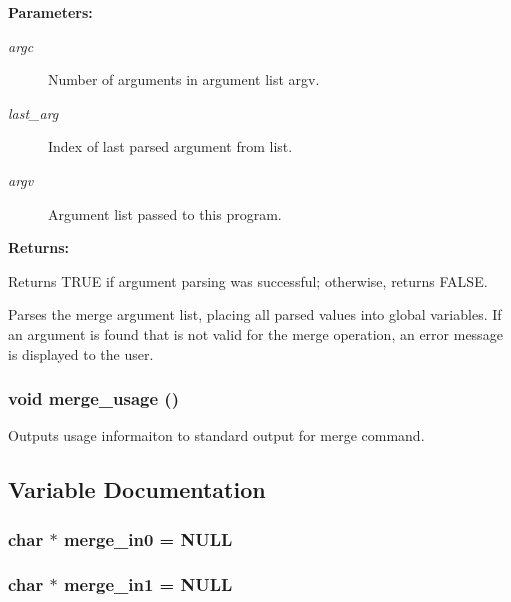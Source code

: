 \begin{Desc}
\item[{\bf Parameters: }]\par
\begin{description}
\item[
{\em argc}]Number of arguments in argument list argv. \item[
{\em last\_\-arg}]Index of last parsed argument from list. \item[
{\em argv}]Argument list passed to this program.

\end{description}
\end{Desc}
\begin{Desc}
\item[{\bf Returns: }]\par
Returns TRUE if argument parsing was successful; otherwise, returns FALSE.

\end{Desc}
Parses the merge argument list, placing all parsed values into global variables. If an argument is found that is not valid for the merge operation, an error message is displayed to the user. 
\subsubsection{\setlength{\rightskip}{0pt plus 5cm}void merge\_\-usage ()}\label{merge_8c_a4}


Outputs usage informaiton to standard output for merge command. 

\subsection{Variable Documentation}
\subsubsection{\setlength{\rightskip}{0pt plus 5cm}char $\ast$ merge\_\-in0 = NULL}\label{merge_8c_a1}


\subsubsection{\setlength{\rightskip}{0pt plus 5cm}char $\ast$ merge\_\-in1 = NULL}\label{merge_8c_a2}


